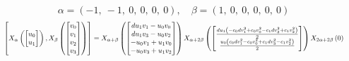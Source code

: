 \documentclass[11pt]{article}
\theoremstyle{definition}
\begin{document}
\[
\alpha = \left( -1, \  -1, \  0, \  0, \  0, \  0\right), \quad \beta = \left( 1, \  0, \  0, \  0, \  0, \  0\right)
\]
\[
\scaletoalign{\textwidth}{\left[ X_{\alpha}\left(\left[\begin{matrix}u_{0}\\u_{1}\end{matrix}\right]\right), X_{\beta}\left(\left[\begin{matrix}v_{0}\\v_{1}\\v_{2}\\v_{3}\end{matrix}\right]\right) \right] = X_{\alpha + \beta}\left(\left[\begin{matrix}d u_{1} v_{1} - u_{0} v_{0}\\d u_{1} v_{3} - u_{0} v_{2}\\- u_{0} v_{1} + u_{1} v_{0}\\- u_{0} v_{3} + u_{1} v_{2}\end{matrix}\right]\right) X_{\alpha + 2\beta}\left(\left[\begin{matrix}\frac{d u_{1} \left(- c_{0} d v_{1}^{2} + c_{0} v_{0}^{2} - c_{1} d v_{3}^{2} + c_{1} v_{2}^{2}\right)}{2}\\\frac{u_{0} \left(c_{0} d v_{1}^{2} - c_{0} v_{0}^{2} + c_{1} d v_{3}^{2} - c_{1} v_{2}^{2}\right)}{2}\end{matrix}\right]\right) X_{2\alpha + 2\beta}\left(0\right)}
\]
\end{document}
